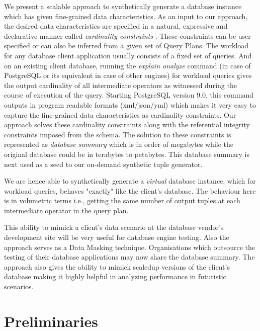 \documentclass[]{article}
\begin{document}
\begin{multicols}{2}
		We present a scalable approach to synthetically generate a database instance which has given fine-grained data characteristics. 
		As an input to our approach, the desired data characteristics are specified in a natural, expressive and declarative manner called \textit{cardinality constraints} \cite{arasu}. 
                These constraints can be user specified or can also be inferred from a given set of Query Plans. 
                The workload for any database client application usually consists of a fixed set of queries. 
                And on an existing client database, running the \textit{explain analyze} command (in case of PostgreSQL or its equivalent in case of other engines) for workload queries gives the output cardinality of all intermediate operators as witnessed during the course of execution of the query. 
                Starting PostgreSQL version 9.0, this command outputs in program readable formats (xml/json/yml) which makes it very easy to capture the fine-grained data characteristics as cardinality constraints. 
		Our approach solves these cardinality constraints along with the referential integrity constraints imposed from the schema. 
		The solution to these constraints is represented as \textit{database summary} which is in order of megabytes while the original database could be in terabytes to petabytes.
		This database summary is next used as a seed to our on-demand synthetic tuple generator. 
		
		We are hence able to synthetically generate a \textit{virtual} database instance, which for workload queries, behaves "exactly" like the client's database. 
		The behaviour here is in volumetric terms i.e., getting the same number of output tuples at each intermediate operator in the query plan. 
                
		This ability to mimick a client's data scenario at the database vendor's development site will be very useful for database engine testing.
		Also the approach serves as a Data Masking technique. Organisations which outsource the testing of their database applications may now share the database summary. 
		The approach also gives the ability to mimick scaledup versions of the client's database making it highly helpful in analyzing performance in futuristic scenarios. 
	
	\section{Preliminaries}

\end{multicols}
\end{document}
